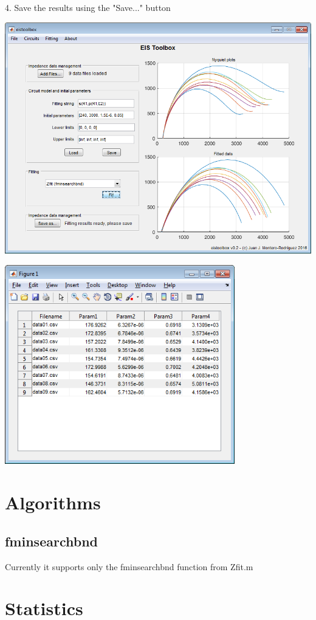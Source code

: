 \documentclass[10pt,a4paper]{memoir}
\begin{document}
4. Save the results using the "Save..." button

\includegraphics[width=15cm]{main_screenshot.png}

\includegraphics[width=10cm]{scr_results.png}


\chapter{Algorithms}

\section{fminsearchbnd}

Currently it supports only the fminsearchbnd function from Zfit.m


\chapter{Statistics}
\end{document}
